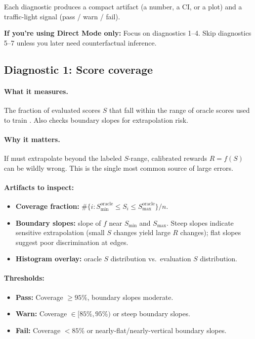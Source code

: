 Each diagnostic produces a compact artifact (a number, a CI, or a plot) and a traffic-light signal (pass / warn / fail).

\textbf{If you're using Direct Mode only:} Focus on diagnostics 1--4. Skip diagnostics 5--7 unless you later need counterfactual inference.

\subsection{Diagnostic 1: Score coverage}

\paragraph{What it measures.} The fraction of evaluated scores $S$ that fall within the range of oracle scores used to train \autocal. Also checks boundary slopes for extrapolation risk.

\paragraph{Why it matters.} If \autocal{} must extrapolate beyond the labeled $S$-range, calibrated rewards $R = f(S)$ can be wildly wrong. This is the single most common source of large errors.

\paragraph{Artifacts to inspect:}
\begin{itemize}
\item \textbf{Coverage fraction:} $\#\{i : S_{\min}^{\text{oracle}} \le S_i \le S_{\max}^{\text{oracle}}\} / n$.
\item \textbf{Boundary slopes:} slope of $f$ near $S_{\min}$ and $S_{\max}$. Steep slopes indicate sensitive extrapolation (small $S$ changes yield large $R$ changes); flat slopes suggest poor discrimination at edges.
\item \textbf{Histogram overlay:} oracle $S$ distribution vs.\ evaluation $S$ distribution.
\end{itemize}

\paragraph{Thresholds:}
\begin{itemize}
\item \textbf{Pass:} Coverage $\ge 95\%$, boundary slopes moderate.
\item \textbf{Warn:} Coverage $\in [85\%, 95\%)$ or steep boundary slopes.
\item \textbf{Fail:} Coverage $< 85\%$ or nearly-flat/nearly-vertical boundary slopes.
\end{itemize}

